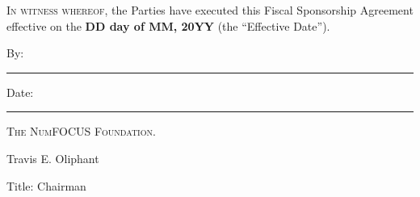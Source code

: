 \documentclass[english,letterpaper,12pt]{article}
\newcommand{\agreementdate}{\textbf{DD day of MM, 20YY}}
\begin{document}
\vfill{}


\textsc{In witness whereof}, the Parties have executed this Fiscal
Sponsorship Agreement effective on the \agreementdate{} (the
``Effective Date'').

\vspace{3em}


By: \hspace{0.95em}\rule{0.50\textwidth}{0.2mm} \hfill{}Date: \rule{0.25\textwidth}{0.2mm}

\hspace{2.5em} \textsc{The NumFOCUS Foundation.}

\hspace{2.5em} Travis E. Oliphant

\hspace{2.5em} Title: Chairman \\[6ex]

\vspace{2ex}


\end{document}
